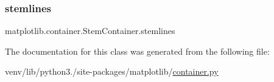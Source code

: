 \mbox{\label{classmatplotlib_1_1container_1_1StemContainer_acbb7cbd106a50104761f2f1ff0d17561}} 
\subsubsection{\texorpdfstring{stemlines}{stemlines}}
{\footnotesize\ttfamily matplotlib.\+container.\+Stem\+Container.\+stemlines}



The documentation for this class was generated from the following file\+:\begin{DoxyCompactItemize}
\item 
venv/lib/python3./site-\/packages/matplotlib/\hyperlink{container_8py}{container.\+py}\end{DoxyCompactItemize}

